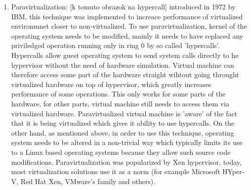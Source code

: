 \begin{itemize}
\begin{enumerate}
\item Paravirtualization: [k tomuto obrazok na hypercall] introduced in 1972 by IBM, this technique was implemented to increace performance of virtualized environmnet closer to non-virtualized. To use paravirtualization, kernel of the operating system needs to be modified, mainly it needs to have replaced any priviledged operation running only in ring 0 by so called 'hypercalls'. Hypercalls allow guest operating system to send system calls directly to he hypervisor without the need of hardware simulation. Virtual machine can therefore access some part of the hardware straight wihtout going throught virtualized hardware on top of hypervisor, which greatly increases performance of some operations. This only works for some parts of the hardware, for other parts, virtual machine still needs to access them via virtualized hardware. Paravirtualized virtual machine is 'aware' of the fact that it is being virtualized which gives it ability to use hypercalls. On the other hand, as mentioned above, in order to use this technique, operating system needs to be altered in a non-trivial way which typically limits its use to a Linux based operating systems because they allow such source code modifications.
Paravirtualization was popularized by Xen hypervisor, today, most virtualization solutions use it as a norm (for example Microsoft HYper-V, Red Hat Xen, VMware's family and others).


\end{enumerate}
\end{itemize}
